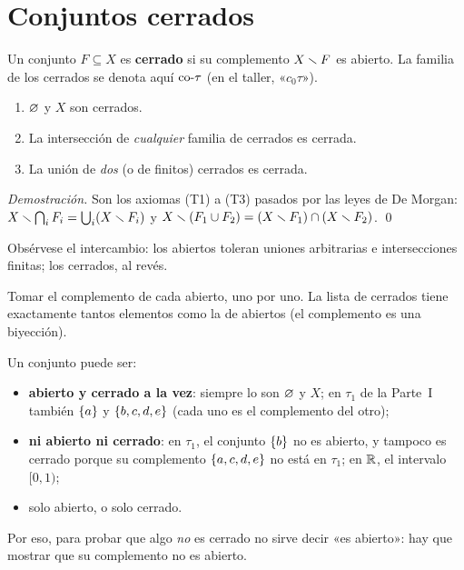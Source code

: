 \section{Conjuntos cerrados}
\begin{definicion}
Un conjunto $F\subseteq X$ es \textbf{cerrado} si su complemento $X\smallsetminus F$ es abierto. La familia de los cerrados se
denota aquí $\mathrm{co}\text{-}\tau$ (en el taller, «$c_0\tau$»).
\end{definicion}
\begin{teorema}
\begin{enumerate}[label=(C\arabic*),leftmargin=2.6em]
\item $\varnothing$ y $X$ son cerrados.
\item La intersección de \emph{cualquier} familia de cerrados es cerrada.
\item La unión de \emph{dos} (o de finitos) cerrados es cerrada.
\end{enumerate}
\end{teorema}
\emph{Demostración.} Son los axiomas (T1) a (T3) pasados por las leyes de De Morgan:
$X\smallsetminus\bigcap_i F_i=\bigcup_i (X\smallsetminus F_i)$ y $X\smallsetminus(F_1\cup F_2)=(X\smallsetminus F_1)\cap(X\smallsetminus F_2)$. \qed

Obsérvese el intercambio: los abiertos toleran uniones arbitrarias e intersecciones finitas; los cerrados, al revés.

\begin{metodo}
Tomar el complemento de cada abierto, uno por uno. La lista de cerrados tiene exactamente tantos elementos como la
de abiertos (el complemento es una biyección).
\end{metodo}

\begin{ojo}
Un conjunto puede ser:
\begin{itemize}
\item \textbf{abierto y cerrado a la vez}: siempre lo son $\varnothing$ y $X$; en $\tau_1$ de la Parte~I también $\{a\}$ y
$\{b,c,d,e\}$ (cada uno es el complemento del otro);
\item \textbf{ni abierto ni cerrado}: en $\tau_1$, el conjunto $\{b\}$ no es abierto, y tampoco es cerrado porque su
complemento $\{a,c,d,e\}$ no está en $\tau_1$; en $\mathbb{R}$, el intervalo $[0,1)$;
\item solo abierto, o solo cerrado.
\end{itemize}
Por eso, para probar que algo \emph{no} es cerrado no sirve decir «es abierto»: hay que mostrar que su complemento no
es abierto.
\end{ojo}

